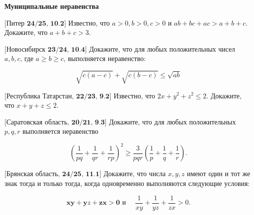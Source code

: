 \centerline{\bf \Huge Муниципальные неравенства}


$\bigl[\textbf{Питер 24/25, 10.2}\bigr]$ 
Известно, что $a>0, b>0, c>0$ и $a b+b c+a c>a+b+c$. Докажите, что $a+b+c>3$.

$\bigl[\textbf{Новосибирск 23/24, 10.4}\bigr]$ 
Докажите, что для любых положительных чисел $a, b, c$, где $a \geq b \geq c$, выполняется неравенство:

$$
\sqrt{c(a-c)}+\sqrt{c(b-c)} \leq \sqrt{a b}
$$


$\bigl[\textbf{Республика Татарстан, 22/23, 9.2}\bigr]$ 
Известно, что $2 x+y^2+z^2 \leqslant 2$. Докажите, что $x+y+z \leqslant 2$.

$\bigl[\textbf{Саратовская область, 20/21, 9.3}\bigr]$ 
Докажите, что для любых положительных $p, q, r$ выполняется неравенство

$$
\left(\frac{1}{p q}+\frac{1}{q r}+\frac{1}{r p}\right)^2 \geq \frac{3}{p q r}\left(\frac{1}{p}+\frac{1}{q}+\frac{1}{r}\right) .
$$

$\bigl[\textbf{Брянская область, 24/25, 11.1}\bigr]$ 
Докажите, что числа $x, y, z$ имеют один и тот же знак тогда и только тогда, когда одновременно выполняются следующие условия:

$$
\boldsymbol{x} \boldsymbol{y}+\boldsymbol{y} z+\boldsymbol{z} \boldsymbol{x}>\mathbf{0} \text { и } \quad \frac{1}{x y}+\frac{1}{y z}+\frac{1}{z x}>0 .
$$